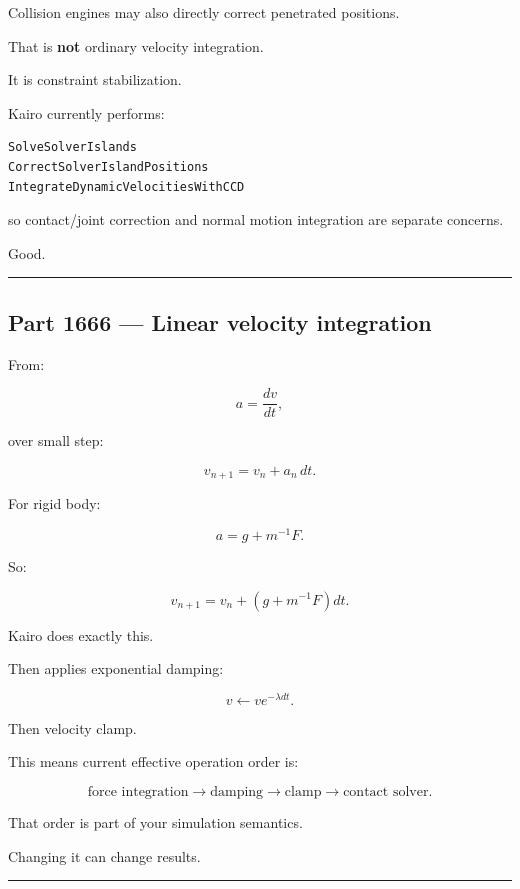 Collision engines may also directly correct penetrated positions.

That is \textbf{not} ordinary velocity integration.

It is constraint stabilization.

Kairo currently performs:

\begin{verbatim}
SolveSolverIslands
CorrectSolverIslandPositions
IntegrateDynamicVelocitiesWithCCD
\end{verbatim}

so contact/joint correction and normal motion integration are separate concerns.

Good.

\begin{center}\rule{0.5\linewidth}{0.5pt}\end{center}

\subsection{Part 1666 --- Linear velocity integration}\label{06-engine-ii-ch037-part-1666-linear-velocity-integration}

\hypertarget{06-engine-ii-ch037-part-1666-linear-velocity-integration}{}

From:

\[
a=\frac{dv}{dt},
\]

over small step:

\[
\boxed{
v_{n+1}
=
v_n+a_n\,dt.
}
\]

For rigid body:

\[
a
=
g
+
m^{-1}F.
\]

So:

\[
\boxed{
v_{n+1}
=
v_n+
\left(
g+m^{-1}F
\right)dt.
}
\]

Kairo does exactly this.

Then applies exponential damping:

\[
v
\leftarrow
ve^{-\lambda dt}.
\]

Then velocity clamp.

This means current effective operation order is:

\[
\text{force integration}
\rightarrow
\text{damping}
\rightarrow
\text{clamp}
\rightarrow
\text{contact solver}.
\]

That order is part of your simulation semantics.

Changing it can change results.

\begin{center}\rule{0.5\linewidth}{0.5pt}\end{center}

